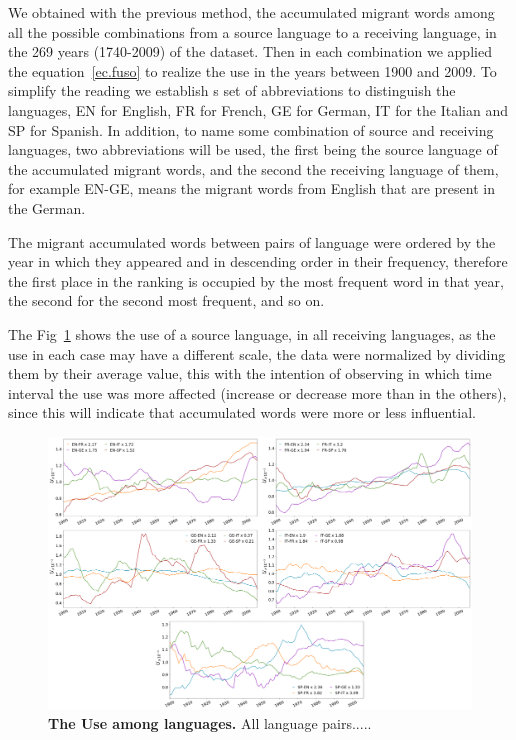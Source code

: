 \documentclass[10pt,letterpaper]{article} %
\begin{document}
We obtained with the previous method, the accumulated migrant words among all the possible combinations from a source language to a receiving language, in the 269 years (1740-2009) of the dataset. Then in each combination we applied the equation~\ref{ec.fuso} to realize the use ​​in the years between 1900 and 2009. To simplify the reading we establish s set of abbreviations to distinguish the languages, EN for English, FR for French, GE for German, IT for the Italian and SP for Spanish. In addition, to name some combination of source  and receiving languages, two abbreviations will be used, the first being the source language of the accumulated migrant words, and the second the receiving language of them, for example EN-GE, means the migrant words from English that are present in the German.

The migrant accumulated words between pairs of language were ordered by the year in which they appeared and in descending order in their frequency, therefore the first place in the ranking is occupied by the most frequent word in that year, the second for the second most frequent, and so on.

The Fig~\ref{fig.UT_art} shows the use of a source language, in all receiving languages, as the use in each case may have a different scale, the data were normalized by dividing them by their average value, this with the intention of observing in which time interval the use was more affected (increase or decrease more than in the others), since this will indicate that accumulated words were more or less influential. 


\begin{figure}[!h]
	\begin{adjustwidth}{-6cm}{1cm}
		\centering
		\includegraphics[scale=0.28]{UT_2.png}
		\caption{{\bf The Use among languages.} All language pairs.....}
		\label{fig.UT_art}
	\end{adjustwidth}
\end{figure}
\end{document}
